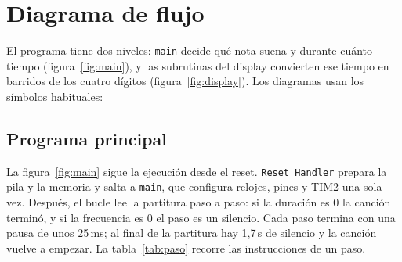 \documentclass[11pt,letterpaper]{article}
\begin{document}
\section{Diagrama de flujo}

El programa tiene dos niveles: \texttt{main} decide qué nota suena y durante cuánto tiempo
(figura~\ref{fig:main}), y las subrutinas del display convierten ese tiempo en barridos de los cuatro
dígitos (figura~\ref{fig:display}). Los diagramas usan los símbolos habituales:

\begin{center}
\end{center}

\subsection{Programa principal}

La figura~\ref{fig:main} sigue la ejecución desde el reset. \texttt{Reset\_Handler} prepara la pila y la
memoria y salta a \texttt{main}, que configura relojes, pines y TIM2 una sola vez. Después, el bucle lee la
partitura paso a paso: si la duración es 0 la canción terminó, y si la frecuencia es 0 el paso es un
silencio. Cada paso termina con una pausa de unos 25\,ms; al final de la partitura hay 1,7\,s de silencio y
la canción vuelve a empezar. La tabla~\ref{tab:paso} recorre las instrucciones de un paso.
\end{document}
